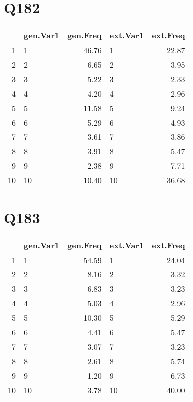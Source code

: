 \documentclass{amsart}
\begin{document}
\section{Q182}
\begin{table}[ht]
\centering
\begin{tabular}{rlrlr}
  \hline
 & gen.Var1 & gen.Freq & ext.Var1 & ext.Freq \\ 
  \hline
1 & 1 & 46.76 & 1 & 22.87 \\ 
  2 & 2 & 6.65 & 2 & 3.95 \\ 
  3 & 3 & 5.22 & 3 & 2.33 \\ 
  4 & 4 & 4.20 & 4 & 2.96 \\ 
  5 & 5 & 11.58 & 5 & 9.24 \\ 
  6 & 6 & 5.29 & 6 & 4.93 \\ 
  7 & 7 & 3.61 & 7 & 3.86 \\ 
  8 & 8 & 3.91 & 8 & 5.47 \\ 
  9 & 9 & 2.38 & 9 & 7.71 \\ 
  10 & 10 & 10.40 & 10 & 36.68 \\ 
   \hline
\end{tabular}
\end{table}

\section{Q183}
\begin{table}[ht]
\centering
\begin{tabular}{rlrlr}
  \hline
 & gen.Var1 & gen.Freq & ext.Var1 & ext.Freq \\ 
  \hline
1 & 1 & 54.59 & 1 & 24.04 \\ 
  2 & 2 & 8.16 & 2 & 3.32 \\ 
  3 & 3 & 6.83 & 3 & 3.23 \\ 
  4 & 4 & 5.03 & 4 & 2.96 \\ 
  5 & 5 & 10.30 & 5 & 5.29 \\ 
  6 & 6 & 4.41 & 6 & 5.47 \\ 
  7 & 7 & 3.07 & 7 & 3.23 \\ 
  8 & 8 & 2.61 & 8 & 5.74 \\ 
  9 & 9 & 1.20 & 9 & 6.73 \\ 
  10 & 10 & 3.78 & 10 & 40.00 \\ 
   \hline
\end{tabular}
\end{table}
\end{document}

